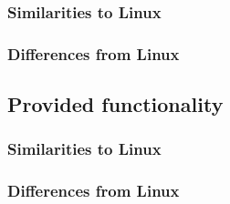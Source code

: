 \documentclass[letterpaper,10pt,titlepage]{article}
\begin{document}
\subsubsection{Similarities to Linux}
\subsubsection{Differences from Linux}
\subsection{Provided functionality}
\subsubsection{Similarities to Linux}
\subsubsection{Differences from Linux}


\newpage
{}

\end{document}

